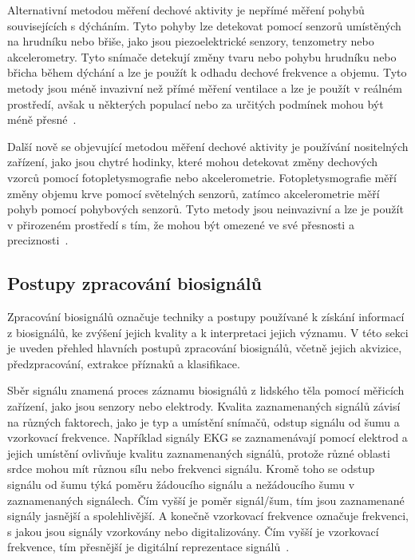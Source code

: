 Alternativní metodou měření dechové aktivity je nepřímé měření pohybů
souvisejících s dýcháním. Tyto pohyby lze detekovat pomocí senzorů umístěných na
hrudníku nebo břiše, jako jsou piezoelektrické senzory, tenzometry nebo
akcelerometry. Tyto snímače detekují změny tvaru nebo pohybu hrudníku nebo
břicha během dýchání a lze je použít k odhadu dechové frekvence a objemu. Tyto
metody jsou méně invazivní než přímé měření ventilace a lze je použít v reálném
prostředí, avšak u některých populací nebo za určitých podmínek mohou být méně
přesné~\cite{Massaroni2019,Massaroni2021,Fazio2021,Liu2019}.

Další nově se objevující metodou měření dechové aktivity je používání
nositelných zařízení, jako jsou chytré hodinky, které mohou detekovat změny
dechových vzorců pomocí fotopletysmografie nebo akcelerometrie.
Fotopletysmografie měří změny objemu krve pomocí světelných senzorů, zatímco
akcelerometrie měří pohyb pomocí pohybových senzorů. Tyto metody jsou
neinvazivní a lze je použít v přirozeném prostředí s tím, že mohou být omezené
ve své přesnosti a preciznosti~\cite{Massaroni2019,Massaroni2021,Fazio2021,
Leube2020,Liu2019,Nam2022,Zschocke2022}. 

\subsection{Postupy zpracování biosignálů}
\label{subsec:postupy_zpracovani_biosignalu}
Zpracování biosignálů označuje techniky a postupy používané k získání informací
z biosignálů, ke zvýšení jejich kvality a k interpretaci jejich významu. V této
sekci je uveden přehled hlavních postupů zpracování biosignálů, včetně jejich
akvizice, předzpracování, extrakce příznaků a klasifikace. 

Sběr signálu znamená proces záznamu biosignálů z lidského těla pomocí měřicích
zařízení, jako jsou senzory nebo elektrody. Kvalita zaznamenaných signálů závisí
na různých faktorech, jako je typ a umístění snímačů, odstup signálu od šumu a
vzorkovací frekvence. Například signály EKG se zaznamenávají pomocí elektrod a
jejich umístění ovlivňuje kvalitu zaznamenaných signálů, protože různé oblasti
srdce mohou mít různou sílu nebo frekvenci signálu. Kromě toho se odstup signálu
od šumu týká poměru žádoucího signálu a nežádoucího šumu v zaznamenaných
signálech. Čím vyšší je poměr signál/šum, tím jsou zaznamenané signály jasnější
a spolehlivější. A konečně vzorkovací frekvence označuje frekvenci, s jakou jsou
signály vzorkovány nebo digitalizovány. Čím vyšší je vzorkovací frekvence, tím
přesnější je digitální reprezentace signálů~\cite{Escabi2005,Karagiannis2011}.

